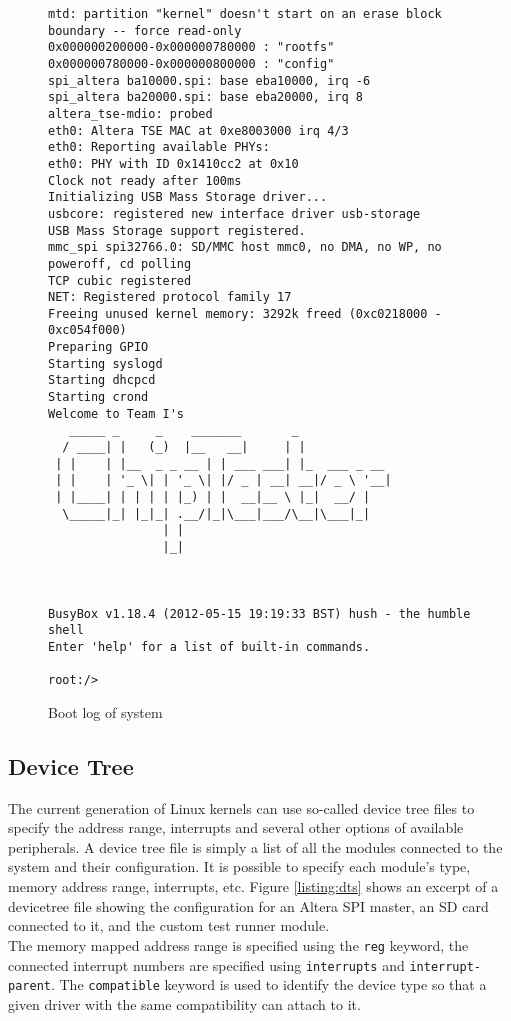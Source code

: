 \begin{figure}[h!]
\begin{lstlisting}
mtd: partition "kernel" doesn't start on an erase block boundary -- force read-only
0x000000200000-0x000000780000 : "rootfs"
0x000000780000-0x000000800000 : "config"
spi_altera ba10000.spi: base eba10000, irq -6
spi_altera ba20000.spi: base eba20000, irq 8
altera_tse-mdio: probed
eth0: Altera TSE MAC at 0xe8003000 irq 4/3
eth0: Reporting available PHYs:
eth0: PHY with ID 0x1410cc2 at 0x10
Clock not ready after 100ms
Initializing USB Mass Storage driver...
usbcore: registered new interface driver usb-storage
USB Mass Storage support registered.
mmc_spi spi32766.0: SD/MMC host mmc0, no DMA, no WP, no poweroff, cd polling
TCP cubic registered
NET: Registered protocol family 17
Freeing unused kernel memory: 3292k freed (0xc0218000 - 0xc054f000)
Preparing GPIO
Starting syslogd
Starting dhcpcd
Starting crond
Welcome to Team I's
   _____ _     _    _______       _
  / ____| |   (_)  |__   __|     | |
 | |    | |__  _ _ __ | | ___ ___| |_  ___ _ __
 | |    | '_ \| | '_ \| |/ _ | __| __|/ _ \ '__|
 | |____| | | | | |_) | |  __|__ \ |_|  __/ |
  \_____|_| |_|_| .__/|_|\___|___/\__|\___|_|
                | |
                |_|



BusyBox v1.18.4 (2012-05-15 19:19:33 BST) hush - the humble shell
Enter 'help' for a list of built-in commands.

root:/>
\end{lstlisting}
\caption{Boot log of system}
\label{listing:bootlog}
\end{figure}


\subsection{Device Tree}
The current generation of Linux kernels can use so-called device tree files to specify the address range,
interrupts and several other options of available peripherals. A device tree file is simply a list
of all the modules connected to the system and their configuration. It is possible to specify each module's
type, memory address range, interrupts, etc. Figure \ref{listing:dts} shows an excerpt of a devicetree file showing the
configuration for an Altera SPI master, an SD card connected to it, and the custom test runner module.
\\

The memory mapped address range is specified using the \texttt{reg} keyword, the connected interrupt numbers
are specified using \texttt{interrupts} and \texttt{interrupt-parent}. The \texttt{compatible} keyword is
used to identify the device type so that a given driver with the same compatibility can attach to it.

